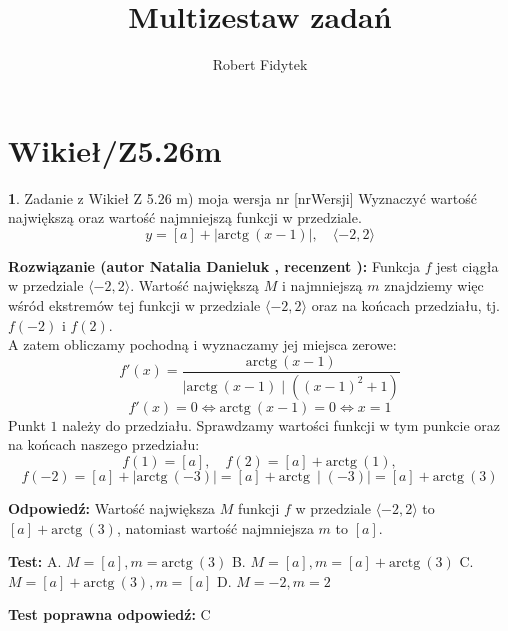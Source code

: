 \documentclass[12pt, a4paper]{article}
\title{Multizestaw zadań}
\author{Robert Fidytek}
\date{}
\theoremstyle{definition} %
\newtheorem{zad}{}
\newcommand{\kategoria}[1]{\section{#1}} %
\newcommand{\zadStart}[1]{\begin{zad}#1\newline} %
\newcommand{\zadStop}{\end{zad}}   %
\newcommand{\rozwStart}[2]{\noindent \textbf{Rozwiązanie (autor #1 , recenzent #2): }\newline} %
\newcommand{\rozwStop}{\newline}                                            %
\newcommand{\odpStart}{\noindent \textbf{Odpowiedź:}\newline}    %
\newcommand{\odpStop}{\newline}                                             %
\newcommand{\testStart}{\noindent \textbf{Test:}\newline} %
\newcommand{\testStop}{\newline} %
\newcommand{\kluczStart}{\noindent \textbf{Test poprawna odpowiedź:}\newline} %
\newcommand{\kluczStop}{\newline} %
\begin{document}
\maketitle

\kategoria{Wikieł/Z5.26m}

\zadStart{Zadanie z Wikieł Z 5.26 m) moja wersja nr [nrWersji]}
Wyznaczyć wartość największą oraz wartość najmniejszą funkcji w przedziale. 
$$y = [a]+ \mid \text{arctg}\ (x-1) \mid, \quad \langle -2,2 \rangle$$
\zadStop

\rozwStart{Natalia Danieluk}{}
Funkcja $f$ jest ciągła w przedziale $\langle -2,2 \rangle$. Wartość największą $M$ i najmniejszą $m$ znajdziemy więc wśród ekstremów tej funkcji w przedziale $\langle -2,2 \rangle$ oraz na końcach przedziału, tj. $f(-2)$ i $f(2)$. \\
A zatem obliczamy pochodną i wyznaczamy jej miejsca zerowe:
$$ f'(x) = \frac{\text{arctg}\ (x-1)}{\mid \text{arctg}\ (x-1) \mid ((x-1)^2+1)} $$
$$ f'(x) = 0 \Leftrightarrow \text{arctg}\ (x-1) = 0 \Leftrightarrow x = 1 $$ 
Punkt $1$ należy do przedziału. Sprawdzamy wartości funkcji w tym punkcie oraz na końcach naszego przedziału: \\
$$ f(1) = [a], \quad f(2) = [a]+ \text{arctg}\ (1), $$
$$ f(-2) = [a]+ \mid \text{arctg}\ (-3) \mid = [a]+ \text{arctg}\ \mid (-3) \mid = [a]+ \text{arctg}\ (3) $$
\rozwStop

\odpStart
Wartość największa $M$ funkcji $f$ w przedziale $\langle -2,2 \rangle$ to $[a]+ \text{arctg}\ (3)$, natomiast wartość najmniejsza $m$ to $[a]$.
\odpStop

\testStart
A. $M=[a], m=\text{arctg}\ (3)$
B. $M=[a], m=[a]+ \text{arctg}\ (3)$
C. $M=[a]+ \text{arctg}\ (3), m=[a]$
D. $M=-2, m=2$
\testStop

\kluczStart
C
\kluczStop
\end{document}
